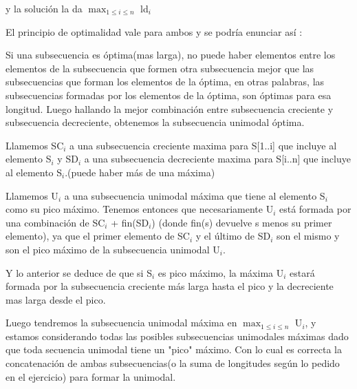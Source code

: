 y la solución la da $\max_{1\leq i\leq n}$ ld$_i$


El principio de optimalidad vale para ambos y se podría enunciar así : 

Si una subsecuencia es óptima(mas larga), no puede haber elementos entre los elementos de la subsecuencia que formen otra subsecuencia mejor que las subsecuencias que forman los elementos de la óptima, en otras palabras, las subsecuencias formadas por los elementos de la óptima, son óptimas para esa longitud.
Luego hallando la mejor combinación entre subsecuencia creciente y subsecuencia decreciente, obtenemos la subsecuencia unimodal óptima. 


Llamemos SC${_i}$ a una subsecuencia creciente maxima para S[1..i] que incluye al elemento S$_i$ y SD${_i}$ a una subsecuencia decreciente maxima para S[i..n] que incluye al elemento S${_i}$.(puede haber más de una máxima)

Llamemos U${_i}$ a una subsecuencia unimodal máxima que tiene al elemento S${_i}$ como su pico máximo.
Tenemos entonces que necesariamente U${_i}$ está formada por una combinación de SC${_i}$ + fin(SD${_i}$) (donde fin(s) devuelve s menos su primer elemento), ya que el primer elemento de SC${_i}$ y el último de SD${_i}$ son el mismo y son el pico máximo de la subsecuencia unimodal U${_i}$.

Y lo anterior se deduce de que si S{$_i$} es pico máximo, la máxima U${_i}$ estará formada por la subsecuencia creciente más larga hasta el pico y la decreciente mas larga desde el pico. 

Luego tendremos la subsecuencia unimodal máxima en $\max_{1\leq i\leq n}$ U${_i}$, y estamos considerando todas las posibles subsecuencias unimodales máximas dado que toda secuencia unimodal tiene un "pico" máximo.
Con lo cual es correcta la concatenación de ambas subsecuencias(o la suma de longitudes según lo pedido en el ejercicio) para formar la unimodal. 
